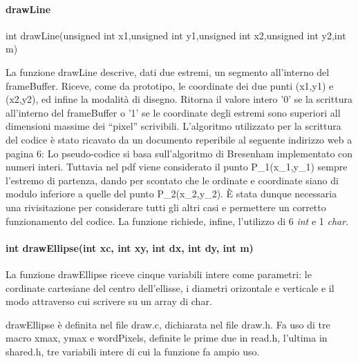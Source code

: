 \documentclass[a4paper]{article}
\begin{document}
		\paragraph{drawLine}
                \begin{lstlistings}
                  int drawLine(unsigned int x1,unsigned int y1,unsigned int x2,unsigned int y2,int m)
                \end{lstlistings}
                La funzione drawLine descrive, dati due estremi, un segmento all'interno del frameBuffer.
                \newline
                Riceve, come da prototipo, le coordinate dei due punti (x1,y1) e (x2,y2), ed infine la modalità di disegno.
                Ritorna il valore intero '0' se la scrittura all'interno del frameBuffer o '1' se le coordinate degli estremi sono superiori all dimensioni massime dei ``pixel'' scrivibili.
                L'algoritmo utilizzato per la scrittura del codice è stato ricavato da un documento reperibile al seguente indirizzo web a pagina 6:\newline
                \href{http://www.idav.ucdavis.edu/education/GraphicsNotes/Bresenhams-Algorithm.pdf}\newline
                Lo pseudo-codice si basa sull'algoritmo di Bresenham implementato con numeri interi.
                Tuttavia nel pdf viene considerato il punto P_{1}(x_{1},y_{1}) sempre l'estremo di partenza, dando per scontato che le ordinate e coordinate siano di modulo inferiore a quelle del punto P_{2}(x_{2},y_{2}).
                È stata dunque necessaria una rivisitazione per considerare tutti gli altri casi e permettere un corretto funzionamento del codice.
                La funzione richiede, infine, l'utilizzo di 6 \textit{int} e 1 \textit{char}.
		\paragraph{int drawEllipse(int xc, int xy, int dx, int dy, int m)}
		La funzione drawEllipse riceve cinque variabili intere come parametri:
                le cordinate cartesiane del centro dell'ellisse, i diametri orizontale e verticale e il modo attraverso cui scrivere su un array di char.
		
		drawEllipse è definita nel file draw.c, dichiarata nel file draw.h.
                Fa uso di tre macro xmax, ymax e wordPixels, definite le prime due in read.h, l'ultima in shared.h, tre variabili intere di cui la funzione fa ampio uso.
		
\end{document}

